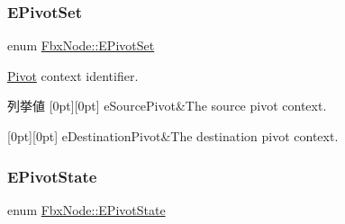 \subsubsection{\texorpdfstring{E\+Pivot\+Set}{EPivotSet}}
{\footnotesize\ttfamily enum \hyperlink{class_fbx_node_ae62b7311ac4727654cdf1ebd5cbf7343}{Fbx\+Node\+::\+E\+Pivot\+Set}}

\hyperlink{class_fbx_node_1_1_pivot}{Pivot} context identifier. \begin{DoxyEnumFields}{列挙値}
[0pt][0pt]{}\mbox{\label{class_fbx_node_ae62b7311ac4727654cdf1ebd5cbf7343ae8ed37a5c7e41f8d1cec9d3fa8424b69}} 
e\+Source\+Pivot&The source pivot context. \\
\hline

[0pt][0pt]{}\mbox{\label{class_fbx_node_ae62b7311ac4727654cdf1ebd5cbf7343a9822ce03ebfd64b85ca6a570201eb3cc}} 
e\+Destination\+Pivot&The destination pivot context. \\
\hline

\end{DoxyEnumFields}
\mbox{\label{class_fbx_node_a153fc75958227fc6728a2233b630b58a}} 
\subsubsection{\texorpdfstring{E\+Pivot\+State}{EPivotState}}
{\footnotesize\ttfamily enum \hyperlink{class_fbx_node_a153fc75958227fc6728a2233b630b58a}{Fbx\+Node\+::\+E\+Pivot\+State}}

